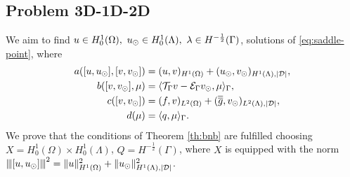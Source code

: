 \documentclass[r]{siamart171218}
\newcommand{\paolo}[1]{{\color{black}#1}}
\begin{document}
\subsection{Problem 3D-1D-2D}
We aim to find $u \in H^1_0(\Omega),\ u_{\odot} \in H_0^1(\Lambda), \ \lambda \in H^{-\frac12}(\Gamma )$,
solutions of \eqref{eq:saddle-point}, where
\begin{align*}
a([u, \ud], [v, \vd])&= (u,v)_{H^1(\Omega)} + (\ud,\vd)_{H^1(\Lambda),|\D|},
\\
b([v, \vd], \mu)&= \langle \trace v - \ext \vd , \mu \rangle_\Gamma,
\\
c([v,\vd])&= (f,v)_{L^2(\Omega)} + (\avrd{g},\vd)_{L^2(\Lambda),|\D|},
\\
d(\mu)&=\paolo{\langle q,\mu\rangle_\Gamma}.
\end{align*}
We prove that the conditions of Theorem \ref{th:bnb} are fulfilled choosing 
$X=H^1_0(\Omega) \times H^1_0(\Lambda)$, $Q=H^{-\frac 12}(\Gamma)$, where $X$  is equipped with the norm ${\left\vert\kern-0.25ex\left\vert\kern-0.25ex\left\vert [u,u_{\odot} ] \right\vert\kern-0.25ex\right\vert\kern-0.25ex\right\vert}^2=\|u\|^2_{H^1(\Omega)} + \|u_{\odot}\|^2_{H^1(\Lambda),|\mathcal{D}|}$.
\end{document}
